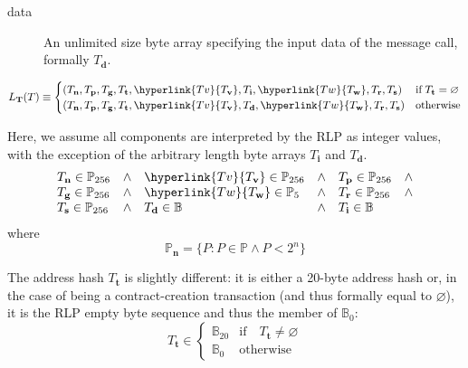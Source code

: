 \documentclass[9pt,oneside]{amsart}
\begin{document}
\begin{multicols}{2}
\begin{description}
\item[data] An unlimited size byte array specifying the input data of the message call, formally $T_\mathbf{d}$.
\end{description}


\begin{equation}
L_\mathbf{T}(T) \equiv \begin{cases}
(T_\mathbf{n}, T_\mathbf{p}, T_\mathbf{g}, T_\mathbf{t}, \hyperlink{T v}{T_\mathbf{v}}, T_\mathbf{i}, \hyperlink{T w}{T_\mathbf{w}}, T_\mathbf{r}, T_\mathbf{s}) & \text{if} \; T_\mathbf{t} = \varnothing\\
(T_\mathbf{n}, T_\mathbf{p}, T_\mathbf{g}, T_\mathbf{t}, \hyperlink{T v}{T_\mathbf{v}}, T_\mathbf{d}, \hyperlink{T w}{T_\mathbf{w}}, T_\mathbf{r}, T_\mathbf{s}) & \text{otherwise}
\end{cases}
\end{equation}

Here, we assume all components are interpreted by the RLP as integer values, with the exception of the arbitrary length byte arrays $T_\mathbf{i}$ and $T_\mathbf{d}$.
\begin{equation}
\begin{array}[t]{lclclc}
T_\mathbf{n} \in \mathbb{P}_{256} & \wedge & \hyperlink{T v}{T_\mathbf{v}} \in \mathbb{P}_{256} & \wedge & T_\mathbf{p} \in \mathbb{P}_{256} & \wedge \\
T_\mathbf{g} \in \mathbb{P}_{256} & \wedge & \hyperlink{T w}{T_\mathbf{w}} \in \mathbb{P}_5 & \wedge & T_\mathbf{r} \in \mathbb{P}_{256} & \wedge \\
T_\mathbf{s} \in \mathbb{P}_{256} & \wedge & T_\mathbf{d} \in \mathbb{B} & \wedge & T_\mathbf{i} \in \mathbb{B}
\end{array}
\end{equation}
where
\begin{equation}
\mathbb{P}_\mathbf{n} = \{ P: P \in \mathbb{P} \wedge P < 2^n \}
\end{equation}

The address hash $T_\mathbf{t}$ is slightly different: it is either a 20-byte address hash or, in the case of being a contract-creation transaction (and thus formally equal to $\varnothing$), it is the RLP empty byte sequence and thus the member of $\mathbb{B}_0$:
\begin{equation}
T_\mathbf{t} \in \begin{cases} \mathbb{B}_{20} & \text{if} \quad T_\mathbf{t} \neq \varnothing \\
\mathbb{B}_{0} & \text{otherwise}\end{cases}
\end{equation}


\end{multicols}
\end{document}
